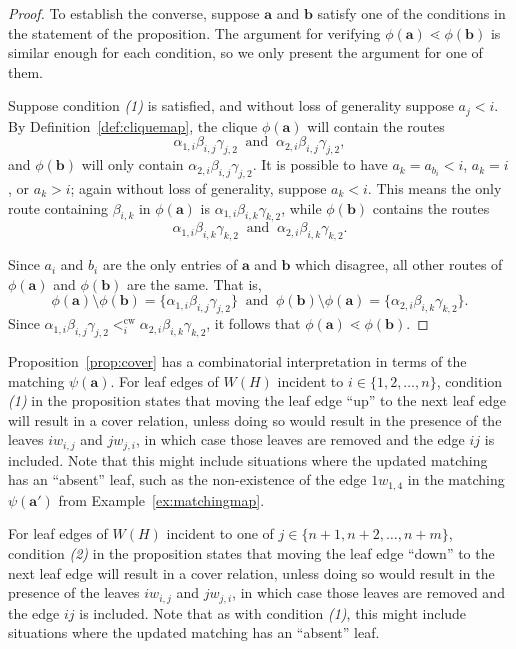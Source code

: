 \documentclass[12pt]{amsart}
\theoremstyle{definition}
\newcommand\ba{\mathbf{a}}
\newcommand\bb{\mathbf{b}}
\DeclareMathOperator{\cw}{cw}
\begin{document}
\begin{proof}
    To establish the converse, suppose $\ba$ and $\bb$ satisfy one of the conditions in the statement of the proposition.
    The argument for verifying $\phi(\ba) \lessdot \phi(\bb)$ is similar enough for each condition, so we only present the argument for one of them.
    
    Suppose condition \emph{(1)} is satisfied, and without loss of generality suppose $a_j < i$.
    By Definition~\ref{def:cliquemap}, the clique $\phi(\ba)$ will contain the routes
    \[
        \alpha_{1,i}\beta_{i,j}\gamma_{j,2}~\text{ and }~\alpha_{2,i}\beta_{i,j}\gamma_{j,2},
    \]
    and $\phi(\bb)$ will only contain $\alpha_{2,i}\beta_{i,j}\gamma_{j,2}$.
    It is possible to have $a_k = a_{b_i} < i$, $a_k = i$, or $a_k > i$; again without loss of generality, suppose $a_k < i$.
    This means the only route containing $\beta_{i,k}$ in $\phi(\ba)$ is $\alpha_{1,i}\beta_{i,k}\gamma_{k,2}$, while $\phi(\bb)$ contains the routes
    \[
        \alpha_{1,i}\beta_{i,k}\gamma_{k,2}~\text{ and }~\alpha_{2,i}\beta_{i,k}\gamma_{k,2}.
    \]
    
    Since $a_i$ and $b_i$ are the only entries of $\ba$ and $\bb$ which disagree, all other routes of $\phi(\ba)$ and $\phi(\bb)$ are the same.
    That is,
    \[
        \phi(\ba) \setminus \phi(\bb) = \{\alpha_{1,i}\beta_{i,j}\gamma_{j,2}\}~\text{ and }~\phi(\bb) \setminus \phi(\ba) = \{\alpha_{2,i}\beta_{i,k}\gamma_{k,2}\}.
    \]
    Since $\alpha_{1,i}\beta_{i,j}\gamma_{j,2} <_i^{\cw} \alpha_{2,i}\beta_{i,k}\gamma_{k,2}$, it follows that $\phi(\ba) \lessdot \phi(\bb)$.
\end{proof}

Proposition~\ref{prop:cover} has a combinatorial interpretation in terms of the matching $\psi(\ba)$.
For leaf edges of $W(H)$ incident to $i\in\{1,2,\ldots,n\}$, condition \emph{(1)} in the proposition states that moving the leaf edge ``up'' to the next leaf edge will result in a cover relation, unless doing so would result in the presence of the leaves $iw_{i,j}$ and $jw_{j,i}$, in which case those leaves are removed and the edge $ij$ is included.
Note that this might include situations where the updated matching has an ``absent'' leaf, such as the non-existence of the edge $1w_{1,4}$ in the matching $\psi(\ba')$ from Example~\ref{ex:matchingmap}.

For leaf edges of $W(H)$ incident to one of $j\in\{n+1,n+2,\ldots,n+m\}$, condition \emph{(2)} in the proposition states that moving the leaf edge ``down'' to the next leaf edge will result in a cover relation, unless doing so would result in the presence of the leaves $iw_{i,j}$ and $jw_{j,i}$, in which case those leaves are removed and the edge $ij$ is included.
Note that as with condition \emph{(1)}, this might include situations where the updated matching has an ``absent'' leaf.
\end{document}
